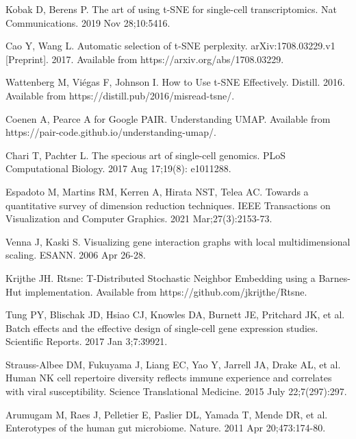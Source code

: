 \documentclass[10pt,letterpaper]{article}
\begin{document}
\begin{thebibliography}{10}
Kobak D, Berens P.
\newblock The art of using t-SNE for single-cell transcriptomics.
\newblock Nat Communications. 2019 Nov 28;10:5416.

Cao Y, Wang L. 
\newblock Automatic selection of t-SNE perplexity.
\newblock arXiv:1708.03229.v1 [Preprint]. 2017. Available from https://arxiv.org/abs/1708.03229.

Wattenberg M, Vi\'egas F, Johnson I.
\newblock How to Use t-SNE Effectively.
\newblock Distill. 2016. Available from https://distill.pub/2016/misread-tsne/.

Coenen A, Pearce A for Google PAIR.
\newblock Understanding UMAP.
\newblock Available from https://pair-code.github.io/understanding-umap/.

Chari T, Pachter L.
\newblock The specious art of single-cell genomics.
\newblock PLoS Computational Biology. 2017 Aug 17;19(8): e1011288.

Espadoto M, Martins RM, Kerren A, Hirata NST, Telea AC.
\newblock Towards a quantitative survey of dimension reduction techniques.
\newblock  IEEE Transactions on Visualization and Computer Graphics. 2021 Mar;27(3):2153-73.

Venna J, Kaski S.
\newblock Visualizing gene interaction graphs with local multidimensional scaling.
\newblock ESANN. 2006 Apr 26-28.

Krijthe JH.
\newblock Rtsne: T-Distributed Stochastic Neighbor Embedding using a Barnes-Hut implementation.
\newblock Available from https://github.com/jkrijthe/Rtsne.

Tung PY, Blischak JD, Hsiao CJ, Knowles DA, Burnett JE, Pritchard JK, et al.
\newblock Batch effects and the effective design of single-cell gene expression studies.
\newblock Scientific Reports. 2017 Jan 3;7:39921.

Strauss-Albee DM, Fukuyama J, Liang EC, Yao Y, Jarrell JA, Drake AL, et al.
\newblock Human NK cell repertoire diversity reflects immune experience and correlates with viral susceptibility.
\newblock Science Translational Medicine. 2015 July 22;7(297):297.

Arumugam M, Raes J, Pelletier E, Paslier DL, Yamada T, Mende DR, et al.
\newblock Enterotypes of the human gut microbiome.
\newblock Nature. 2011 Apr 20;473:174-80.


\end{thebibliography}
\end{document}
